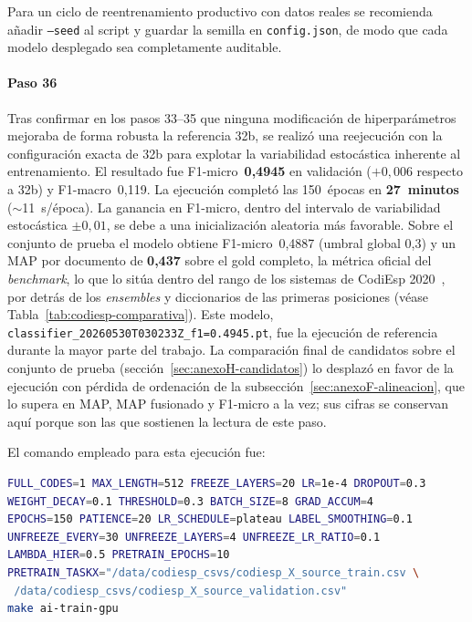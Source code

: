 Para un ciclo de reentrenamiento productivo con datos reales se recomienda añadir \texttt{--seed} al script y guardar la semilla en \texttt{config.json}, de modo que cada modelo desplegado sea completamente auditable.

\paragraph{Paso 36}
\begin{sloppypar}
Tras confirmar en los pasos 33--35 que ninguna modificación de hiperparámetros mejoraba de forma robusta la referencia 32b, se realizó una reejecución con la configuración exacta de 32b para explotar la variabilidad estocástica inherente al entrenamiento. El resultado fue F1-micro~\textbf{0,4945} en validación ($+0{,}006$ respecto a 32b) y F1-macro~0,119. La ejecución completó las 150~épocas en \textbf{27~minutos} ($\sim$11~s/época). La ganancia en F1-micro, dentro del intervalo de variabilidad estocástica $\pm 0{,}01$, se debe a una inicialización aleatoria más favorable. Sobre el conjunto de prueba el modelo obtiene F1-micro~0,4887 (umbral global 0,3) y un MAP por documento de \textbf{0,437} sobre el gold completo, la métrica oficial del \emph{benchmark}, lo que lo sitúa dentro del rango de los sistemas de CodiEsp 2020~\cite{miranda2020}, por detrás de los \emph{ensembles} y diccionarios de las primeras posiciones (véase Tabla~\ref{tab:codiesp-comparativa}). Este modelo, \texttt{classifier\_20260530T030233Z\_f1=0.4945.pt}, fue la ejecución de referencia durante la mayor parte del trabajo. La comparación final de candidatos sobre el conjunto de prueba (sección~\ref{sec:anexoH-candidatos}) lo desplazó en favor de la ejecución con pérdida de ordenación de la subsección~\ref{sec:anexoF-alineacion}, que lo supera en MAP, MAP fusionado y F1-micro a la vez; sus cifras se conservan aquí porque son las que sostienen la lectura de este paso.

El comando empleado para esta ejecución fue:
\begin{lstlisting}[language=bash,basicstyle=\small\ttfamily,showstringspaces=false]
FULL_CODES=1 MAX_LENGTH=512 FREEZE_LAYERS=20 LR=1e-4 DROPOUT=0.3
WEIGHT_DECAY=0.1 THRESHOLD=0.3 BATCH_SIZE=8 GRAD_ACCUM=4
EPOCHS=150 PATIENCE=20 LR_SCHEDULE=plateau LABEL_SMOOTHING=0.1
UNFREEZE_EVERY=30 UNFREEZE_LAYERS=4 UNFREEZE_LR_RATIO=0.1
LAMBDA_HIER=0.5 PRETRAIN_EPOCHS=10
PRETRAIN_TASKX="/data/codiesp_csvs/codiesp_X_source_train.csv \
 /data/codiesp_csvs/codiesp_X_source_validation.csv"
make ai-train-gpu
\end{lstlisting}
\end{sloppypar}

